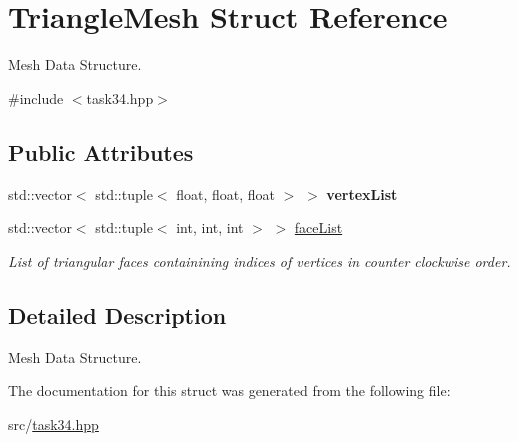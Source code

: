 \hypertarget{struct_triangle_mesh}{}\section{Triangle\+Mesh Struct Reference}
\label{struct_triangle_mesh}


Mesh Data Structure.  




{\ttfamily \#include $<$task34.\+hpp$>$}

\subsection*{Public Attributes}
\begin{DoxyCompactItemize}
\item 
\hypertarget{struct_triangle_mesh_ae8a38b461b3830c6c75f6889fcc02936}{}\label{struct_triangle_mesh_ae8a38b461b3830c6c75f6889fcc02936} 
std\+::vector$<$ std\+::tuple$<$ float, float, float $>$ $>$ {\bfseries vertex\+List}
\item 
\hypertarget{struct_triangle_mesh_a549b1932c72a2fff40de5592f887e783}{}\label{struct_triangle_mesh_a549b1932c72a2fff40de5592f887e783} 
std\+::vector$<$ std\+::tuple$<$ int, int, int $>$ $>$ \hyperlink{struct_triangle_mesh_a549b1932c72a2fff40de5592f887e783}{face\+List}
\begin{DoxyCompactList}\small\item\em List of triangular faces containining indices of vertices in counter clockwise order. \end{DoxyCompactList}\end{DoxyCompactItemize}


\subsection{Detailed Description}
Mesh Data Structure. 

The documentation for this struct was generated from the following file\+:\begin{DoxyCompactItemize}
\item 
src/\hyperlink{task34_8hpp}{task34.\+hpp}\end{DoxyCompactItemize}
